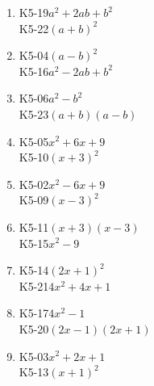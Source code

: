 \documentclass[11pt,a4paper]{article}
\begin{document}
\begin{enumerate}[leftmargin=1.6em, itemsep=0.7em]
\item \begin{minipage}[t]{\linewidth}\textsf{\small K5-19}\quad $a^2 + 2ab + b^2$ \\ \textsf{\small K5-22}\quad $(a + b)^2$\end{minipage}
\item \begin{minipage}[t]{\linewidth}\textsf{\small K5-04}\quad $(a - b)^2$ \\ \textsf{\small K5-16}\quad $a^2 - 2ab + b^2$\end{minipage}
\item \begin{minipage}[t]{\linewidth}\textsf{\small K5-06}\quad $a^2 - b^2$ \\ \textsf{\small K5-23}\quad $(a + b)(a - b)$\end{minipage}
\item \begin{minipage}[t]{\linewidth}\textsf{\small K5-05}\quad $x^2 + 6x + 9$ \\ \textsf{\small K5-10}\quad $(x + 3)^2$\end{minipage}
\item \begin{minipage}[t]{\linewidth}\textsf{\small K5-02}\quad $x^2 - 6x + 9$ \\ \textsf{\small K5-09}\quad $(x - 3)^2$\end{minipage}
\item \begin{minipage}[t]{\linewidth}\textsf{\small K5-11}\quad $(x + 3)(x - 3)$ \\ \textsf{\small K5-15}\quad $x^2 - 9$\end{minipage}
\item \begin{minipage}[t]{\linewidth}\textsf{\small K5-14}\quad $(2x + 1)^2$ \\ \textsf{\small K5-21}\quad $4x^2 + 4x + 1$\end{minipage}
\item \begin{minipage}[t]{\linewidth}\textsf{\small K5-17}\quad $4x^2 - 1$ \\ \textsf{\small K5-20}\quad $(2x - 1)(2x + 1)$\end{minipage}
\item \begin{minipage}[t]{\linewidth}\textsf{\small K5-03}\quad $x^2 + 2x + 1$ \\ \textsf{\small K5-13}\quad $(x + 1)^2$\end{minipage}

\end{enumerate}
\end{document}
